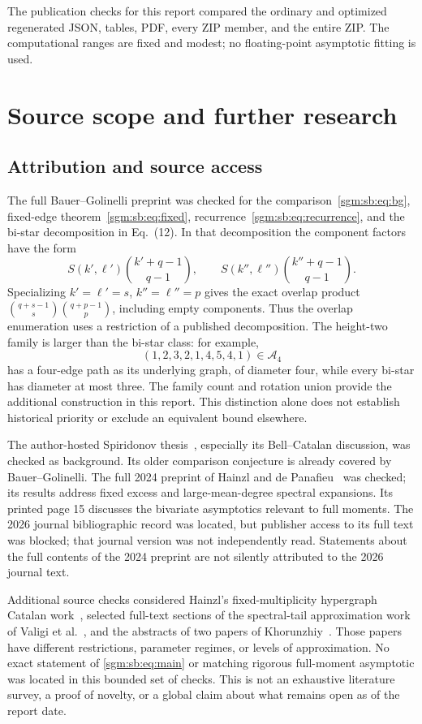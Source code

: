 \documentclass[11pt,letterpaper]{article}
\theoremstyle{remark}\newtheorem{remark}[theorem]{Remark}
\newcommand{\Ac}{\mathcal A}
\theoremstyle{definition}\newtheorem{definition}[theorem]{Definition}
\begin{document}
The publication checks for this report compared the ordinary and optimized regenerated JSON, tables, PDF, every ZIP member, and the entire ZIP. The computational ranges are fixed and modest; no floating-point asymptotic fitting is used.

\section{Source scope and further research}\label{sgm:sb:sec:sources}
\subsection{Attribution and source access}
The full Bauer--Golinelli preprint was checked for the comparison~\eqref{sgm:sb:eq:bg}, fixed-edge theorem~\eqref{sgm:sb:eq:fixed}, recurrence~\eqref{sgm:sb:eq:recurrence}, and the bi-star decomposition in Eq.\ (12). In that decomposition the component factors have the form
\[
 S(k',\ell')\binom{k'+q-1}{q-1},\qquad
 S(k'',\ell'')\binom{k''+q-1}{q-1}.
\]
Specializing $k'=\ell'=s$, $k''=\ell''=p$ gives the exact overlap product
$\binom{q+s-1}{s}\binom{q+p-1}{p}$, including empty components. Thus the overlap enumeration uses a restriction of a published decomposition. The height-two family is larger than the bi-star class: for example,
\[
 (1,2,3,2,1,4,5,4,1)\in\Ac_4
\]
has a four-edge path as its underlying graph, of diameter four, while every bi-star has diameter at most three. The family count and rotation union provide the additional construction in this report. This distinction alone does not establish historical priority or exclude an equivalent bound elsewhere.

The author-hosted Spiridonov thesis~\cite{spiridonov}, especially its Bell--Catalan discussion, was checked as background. Its older comparison conjecture is already covered by Bauer--Golinelli. The full 2024 preprint of Hainzl and de Panafieu~\cite{hdp} was checked; its results address fixed excess and large-mean-degree spectral expansions. Its printed page 15 discusses the bivariate asymptotics relevant to full moments. The 2026 journal bibliographic record was located, but publisher access to its full text was blocked; that journal version was not independently read. Statements about the full contents of the 2024 preprint are not silently attributed to the 2026 journal text.

Additional source checks considered Hainzl's fixed-multiplicity hypergraph Catalan work~\cite{hainzl}, selected full-text sections of the spectral-tail approximation work of Valigi et al.~\cite{valigi}, and the abstracts of two papers of Khorunzhiy~\cite{khor1,khor2}. Those papers have different restrictions, parameter regimes, or levels of approximation. No exact statement of \eqref{sgm:sb:eq:main} or matching rigorous full-moment asymptotic was located in this bounded set of checks. This is not an exhaustive literature survey, a proof of novelty, or a global claim about what remains open as of the report date.
\end{document}
